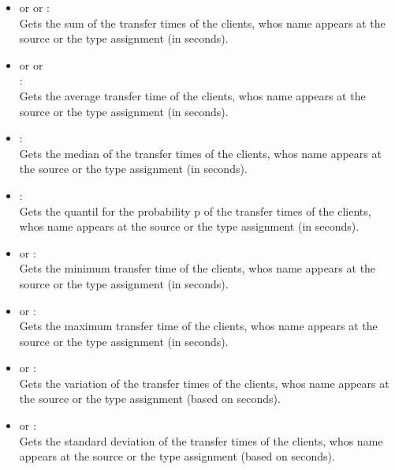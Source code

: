 \begin{itemize}

\item
{} or  or :\\
Gets the sum of the transfer times of the clients, whos name appears at the source or the type assignment  (in seconds).

\item
{} or  or\\
:\\
Gets the average transfer time of the clients, whos name appears at the source or the type assignment  (in seconds).

\item
{}:\\
Gets the median of the transfer times of the clients, whos name appears at the source or the type assignment  (in seconds).

\item
{}:\\
Gets the quantil for the probability p of the transfer times of the clients, whos name appears at the source or the type assignment  (in seconds).

\item
{} or :\\
Gets the minimum transfer time of the clients, whos name appears at the source or the type assignment  (in seconds).

\item
{} or :\\
Gets the maximum transfer time of the clients, whos name appears at the source or the type assignment  (in seconds).

\item
{} or :\\
Gets the variation of the transfer times of the clients, whos name appears at the source or the type assignment  (based on seconds).

\item
{} or :\\
Gets the standard deviation of the transfer times of the clients, whos name appears at the source or the type assignment  (based on seconds).


\end{itemize}
